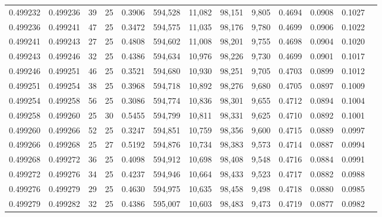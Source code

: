 \begin{tabular}{rrrrrrrrrrrrr}
0.499232 & 0.499236 &    39 &  25 &                                     0.3906 & 594,528 &  11,082 &  98,151 &   9,805 & 0.4694 & 0.0908 & 0.1027 \\
0.499236 & 0.499241 &    47 &  25 &                                     0.3472 & 594,575 &  11,035 &  98,176 &   9,780 & 0.4699 & 0.0906 & 0.1022 \\
0.499241 & 0.499243 &    27 &  25 &                                     0.4808 & 594,602 &  11,008 &  98,201 &   9,755 & 0.4698 & 0.0904 & 0.1020 \\
0.499243 & 0.499246 &    32 &  25 &                                     0.4386 & 594,634 &  10,976 &  98,226 &   9,730 & 0.4699 & 0.0901 & 0.1017 \\
0.499246 & 0.499251 &    46 &  25 &                                     0.3521 & 594,680 &  10,930 &  98,251 &   9,705 & 0.4703 & 0.0899 & 0.1012 \\
0.499251 & 0.499254 &    38 &  25 &                                     0.3968 & 594,718 &  10,892 &  98,276 &   9,680 & 0.4705 & 0.0897 & 0.1009 \\
0.499254 & 0.499258 &    56 &  25 &                                     0.3086 & 594,774 &  10,836 &  98,301 &   9,655 & 0.4712 & 0.0894 & 0.1004 \\
0.499258 & 0.499260 &    25 &  30 &                                     0.5455 & 594,799 &  10,811 &  98,331 &   9,625 & 0.4710 & 0.0892 & 0.1001 \\
0.499260 & 0.499266 &    52 &  25 &                                     0.3247 & 594,851 &  10,759 &  98,356 &   9,600 & 0.4715 & 0.0889 & 0.0997 \\
0.499266 & 0.499268 &    25 &  27 &                                     0.5192 & 594,876 &  10,734 &  98,383 &   9,573 & 0.4714 & 0.0887 & 0.0994 \\
0.499268 & 0.499272 &    36 &  25 &                                     0.4098 & 594,912 &  10,698 &  98,408 &   9,548 & 0.4716 & 0.0884 & 0.0991 \\
0.499272 & 0.499276 &    34 &  25 &                                     0.4237 & 594,946 &  10,664 &  98,433 &   9,523 & 0.4717 & 0.0882 & 0.0988 \\
0.499276 & 0.499279 &    29 &  25 &                                     0.4630 & 594,975 &  10,635 &  98,458 &   9,498 & 0.4718 & 0.0880 & 0.0985 \\
0.499279 & 0.499282 &    32 &  25 &                                     0.4386 & 595,007 &  10,603 &  98,483 &   9,473 & 0.4719 & 0.0877 & 0.0982 \\

\end{tabular}

